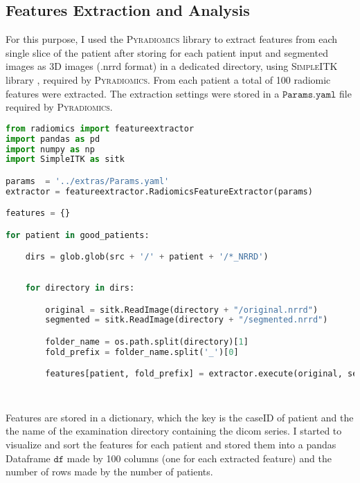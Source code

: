 \documentclass{standalone}
\begin{document}
\subsection{Features Extraction and Analysis}

For this purpose, I used the \textsc{Pyradiomics} library\cite{Pyradiomics} to extract features from each single slice of the patient after storing for each patient input and segmented images as 3D images (.nrrd format) in a dedicated directory, using \textsc{SimpleITK} library \cite{SimpleITK}, required by \textsc{Pyradiomics}. 
From each patient a total of 100 radiomic features were extracted.
The extraction settings were stored in a $\mathtt{Params.yaml}$ file required by \textsc{Pyradiomics}.
\begin{lstlisting}[language = python, caption=Features extraction implementation]
from radiomics import featureextractor
import pandas as pd
import numpy as np
import SimpleITK as sitk

params  = '../extras/Params.yaml'
extractor = featureextractor.RadiomicsFeatureExtractor(params)

features = {}

for patient in good_patients:

    dirs = glob.glob(src + '/' + patient + '/*_NRRD')
    
    
    for directory in dirs:

        original = sitk.ReadImage(directory + "/original.nrrd")
        segmented = sitk.ReadImage(directory + "/segmented.nrrd")

        folder_name = os.path.split(directory)[1]
        fold_prefix = folder_name.split('_')[0]

        features[patient, fold_prefix] = extractor.execute(original, segmented)

    
\end{lstlisting}

Features are stored in a dictionary, which the key is the caseID of patient and the the name of the examination directory containing the dicom series.
I started to visualize and sort the features for each patient and stored them into a pandas Dataframe $\mathtt{df}$ made by 100 columns (one for each extracted feature) and the number of rows made by the number of patients.
\end{document}
